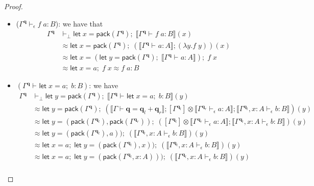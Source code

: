 \documentclass[acmsmall,screen,anonymous,review]{acmart}
\newcommand{\mb}[1]{\ensuremath{\mathbf{#1}}}
\newcommand{\ms}[1]{\ensuremath{\mathsf{#1}}}
\newcommand{\letexpr}[3]{\ensuremath{\ms{let}\;#1 = #2;\;#3}}
\newcommand{\qsp}[4]{#1 \vdash #2 = #3 + #4}
\newcommand{\hasty}[4]{#1 \vdash_{#2} #3: {#4}}
\newcommand{\dnt}[1]{\llbracket{#1}\rrbracket}
\begin{document}
\begin{proof}
\begin{itemize}
\begin{align*}
      \letexpr{(w, u)}{(x, ())}{u} \approx x : A
    \end{align*}
    as desired.
    \item ($\hasty{\Gamma^{\mb{q}}}{\epsilon}{f\;a}{B}$): we have that
    \begin{align*}
    \Gamma^{\mb{q}} &\vdash_\bot
      \letexpr{x}{\ms{pack}(\Gamma^{\mb{q}})}{\dnt{\hasty{\Gamma^{\mb{q}}}{}{f\;a}{B}}(x)}
      \\ &\approx 
      \letexpr{x}{\ms{pack}(\Gamma^{\mb{q}})}
        {(\dnt{\hasty{\Gamma^{\mb{q}}}{}{a}{A}} ; (\lambda y.f\;y))(x)}
      \\ &\approx
      \letexpr{x}{(\letexpr{y}{\ms{pack}(\Gamma^{\mb{q}})}{\dnt{\hasty{\Gamma^{\mb{q}}}{}{a}{A}}})}
        {f\;x} 
      \\ &\approx
      \letexpr{x}{a}{f\;x} \approx f\;a : B
    \end{align*}
    \item $(\hasty{\Gamma^{\mb{q}}}{}{\letexpr{x}{a}{b}}{B})$: we have
    \begin{align*}
    \Gamma^{\mb{q}} &\vdash_\bot 
      \letexpr{y}{\ms{pack}(\Gamma^{\mb{q}})}
        {\dnt{\hasty{\Gamma^{\mb{q}}}{}{\letexpr{x}{a}{b}}{B}}(y)} \\
      &\approx
      \letexpr{y}{\ms{pack}(\Gamma^{\mb{q}})}{
        (
          \dnt{\qsp{\Gamma}{\mb{q}}{\mb{q}_l}{\mb{q}_r}}
          ; [\Gamma^{\mb{q}_l}] \otimes \dnt{\hasty{\Gamma^{\mb{q}_r}}{\epsilon}{a}{A}}
          ; \dnt{\hasty{\Gamma^{\mb{q}_l}, x : A}{\epsilon}{b}{B}}
        )(y)
      } \\
      &\approx
      \letexpr{y}{(\ms{pack}(\Gamma^{\mb{q}_l}), \ms{pack}(\Gamma^{\mb{q}_r}))}{
        (
          [\Gamma^{\mb{q}_l}] \otimes \dnt{\hasty{\Gamma^{\mb{q}_r}}{\epsilon}{a}{A}}
          ; \dnt{\hasty{\Gamma^{\mb{q}_l}, x : A}{\epsilon}{b}{B}}
        )(y)
      }
      \\
      &\approx
      \letexpr{y}{(\ms{pack}(\Gamma^{\mb{q}_l}), a))}{
        (
          \dnt{\hasty{\Gamma^{\mb{q}_l}, x : A}{\epsilon}{b}{B}}
        )(y)
      }
      \\
      &\approx
      \letexpr{x}{a}{\letexpr{y}{(\ms{pack}(\Gamma^{\mb{q}_l}), x))}{
        (
          \dnt{\hasty{\Gamma^{\mb{q}_l}, x : A}{\epsilon}{b}{B}}
        )(y)
      }}
      \\
      &\approx
      \letexpr{x}{a}{\letexpr{y}{(\ms{pack}(\Gamma^{\mb{q}_l}, x : A)))}{
        (
          \dnt{\hasty{\Gamma^{\mb{q}_l}, x : A}{\epsilon}{b}{B}}
        )(y)
      }}
      \\

\end{align*}
\end{itemize}
\end{proof}
\end{document}
